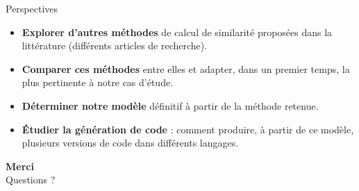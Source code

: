\documentclass[11pt]{beamer}
\begin{document}
\begin{frame}{Perspectives}
  \begin{itemize}[leftmargin=1.2em, itemsep=0.7em]
    \item \textbf{Explorer d'autres méthodes} de calcul de similarité proposées
      dans la littérature (différents articles de recherche).
    \item \textbf{Comparer ces méthodes} entre elles et adapter, dans un premier
      temps, la plus pertinente à notre cas d'étude.
    \item \textbf{Déterminer notre modèle} définitif à partir de la méthode retenue.
    \item \textbf{Étudier la génération de code} : comment produire, à partir de ce
      modèle, plusieurs versions de code dans différents langages.
  \end{itemize}
\end{frame}

\begin{frame}
  \begin{center}
    {\Huge\bfseries\color{navy} Merci}\\[1em]
    {\large Questions ?}
  \end{center}
\end{frame}
\end{document}
